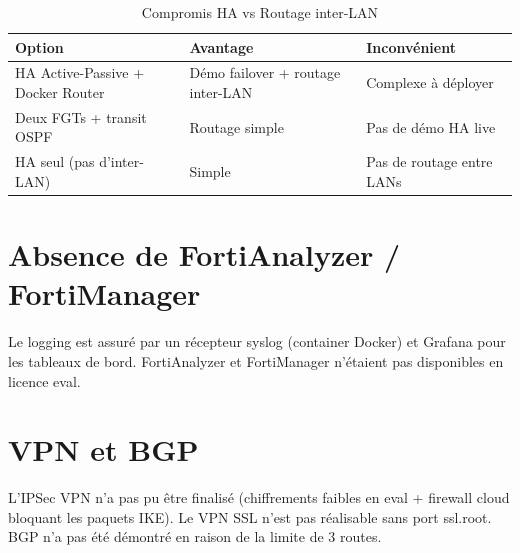 \begin{table}[H]
\centering
\caption{Compromis HA vs Routage inter-LAN}
\label{tab:ha-routing}
\begin{tabularx}{\textwidth}{|X|X|X|}
\hline
\textbf{Option} & \textbf{Avantage} & \textbf{Inconvénient} \\
\hline
HA Active-Passive + Docker Router & Démo failover + routage inter-LAN & Complexe à déployer \\
\hline
Deux FGTs + transit OSPF & Routage simple & Pas de démo HA live \\
\hline
HA seul (pas d'inter-LAN) & Simple & Pas de routage entre LANs \\
\hline
\end{tabularx}
\end{table}

\section{Absence de FortiAnalyzer / FortiManager}

Le logging est assuré par un récepteur syslog (container Docker) et Grafana pour les tableaux de bord. FortiAnalyzer et FortiManager n'étaient pas disponibles en licence eval.

\section{VPN et BGP}

L'IPSec VPN n'a pas pu être finalisé (chiffrements faibles en eval + firewall cloud bloquant les paquets IKE). Le VPN SSL n'est pas réalisable sans port ssl.root. BGP n'a pas été démontré en raison de la limite de 3 routes.
